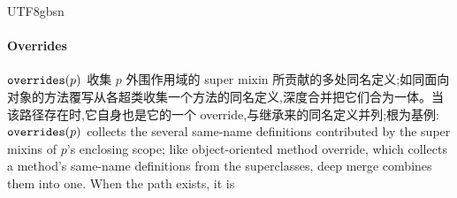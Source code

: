 \begin{CJK*}{UTF8}{gbsn}
\paragraph{Overrides}
\ifPaperChinese
$\mathtt{overrides}(p)$ 收集 $p$ 外围作用域的 super mixin 所贡献的多处同名定义;如同面向对象的方法覆写从各超类收集一个方法的同名定义,深度合并把它们合为一体。当该路径存在时,它自身也是它的一个 override,与继承来的同名定义并列;根为基例:
\else
$\mathtt{overrides}(p)$ collects the several same-name definitions contributed by
the super mixins of $p$'s enclosing scope; like object-oriented method
override, which collects a method's same-name definitions from the
superclasses, deep merge combines them into one. When the path exists, it is

\end{CJK*}
